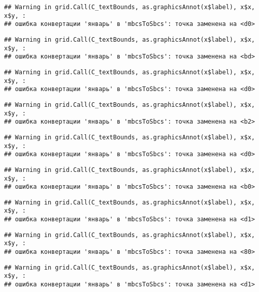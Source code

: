 \documentclass[
]{article}
\begin{document}
\begin{verbatim}
## Warning in grid.Call(C_textBounds, as.graphicsAnnot(x$label), x$x, x$y, :
## ошибка конвертации 'январь' в 'mbcsToSbcs': точка заменена на <d0>
\end{verbatim}

\begin{verbatim}
## Warning in grid.Call(C_textBounds, as.graphicsAnnot(x$label), x$x, x$y, :
## ошибка конвертации 'январь' в 'mbcsToSbcs': точка заменена на <bd>
\end{verbatim}

\begin{verbatim}
## Warning in grid.Call(C_textBounds, as.graphicsAnnot(x$label), x$x, x$y, :
## ошибка конвертации 'январь' в 'mbcsToSbcs': точка заменена на <d0>
\end{verbatim}

\begin{verbatim}
## Warning in grid.Call(C_textBounds, as.graphicsAnnot(x$label), x$x, x$y, :
## ошибка конвертации 'январь' в 'mbcsToSbcs': точка заменена на <b2>
\end{verbatim}

\begin{verbatim}
## Warning in grid.Call(C_textBounds, as.graphicsAnnot(x$label), x$x, x$y, :
## ошибка конвертации 'январь' в 'mbcsToSbcs': точка заменена на <d0>
\end{verbatim}

\begin{verbatim}
## Warning in grid.Call(C_textBounds, as.graphicsAnnot(x$label), x$x, x$y, :
## ошибка конвертации 'январь' в 'mbcsToSbcs': точка заменена на <b0>
\end{verbatim}

\begin{verbatim}
## Warning in grid.Call(C_textBounds, as.graphicsAnnot(x$label), x$x, x$y, :
## ошибка конвертации 'январь' в 'mbcsToSbcs': точка заменена на <d1>
\end{verbatim}

\begin{verbatim}
## Warning in grid.Call(C_textBounds, as.graphicsAnnot(x$label), x$x, x$y, :
## ошибка конвертации 'январь' в 'mbcsToSbcs': точка заменена на <80>
\end{verbatim}

\begin{verbatim}
## Warning in grid.Call(C_textBounds, as.graphicsAnnot(x$label), x$x, x$y, :
## ошибка конвертации 'январь' в 'mbcsToSbcs': точка заменена на <d1>
\end{verbatim}
\end{document}
